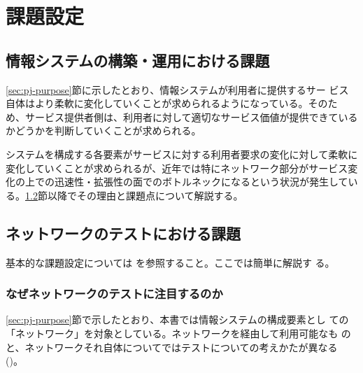 
\chapter{課題設定}
\label{chap:problem-setting}

 \section{情報システムの構築・運用における課題}
 \label{sec:system-problem}

\ref{sec:pj-purpose}節に示したとおり、情報システムが利用者に提供するサー
ビス自体はより柔軟に変化していくことが求められるようになっている。そのた
め、サービス提供者側は、利用者に対して適切なサービス価値が提供できている
かどうかを判断していくことが求められる。

システムを構成する各要素がサービスに対する利用者要求の変化に対して柔軟に
変化していくことが求められるが、近年では特にネットワーク部分がサービス変
化の上での迅速性・拡張性の面でのボトルネックになるという状況が発生してい
る。\ref{sec:nw-test-problem}節以降でその理由と課題点について解説する。

 \section{ネットワークのテストにおける課題}
 \label{sec:nw-test-problem}


基本的な課題設定については \lopjpoc を参照すること。ここでは簡単に解説す
る。

  \subsection{なぜネットワークのテストに注目するのか}
  \label{sec:reason-to-focus-network}

\ref{sec:pj-purpose}節で示したとおり、本書では情報システムの構成要素とし
ての「ネットワーク」を対象としている。ネットワークを経由して利用可能なも
のと、ネットワークそれ自体についてではテストについての考えかたが異なる
()。

